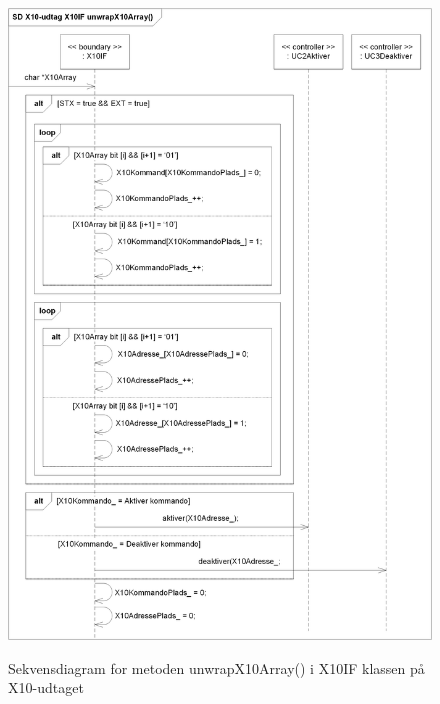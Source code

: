 \begin{figure}[!htb]
     {\includegraphics[width=\textwidth]{billeder/uml/X10-Udtag_unwrapX10Array_SD}}
     \caption{Sekvensdiagram for metoden unwrapX10Array() i X10IF klassen på X10-udtaget}
     \label{fig:X10-Udtag_unwrapX10Array_SD}
\end{figure}
